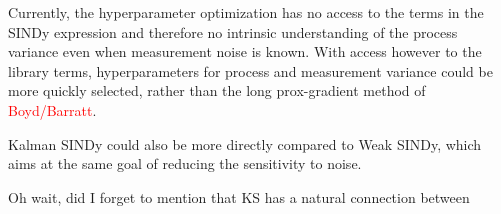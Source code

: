 \documentclass{article}
\newcommand{\red}[1]{\textcolor{red}{#1}}
\begin{document}
Currently, the hyperparameter optimization has no access to the terms in the SINDy expression and therefore no intrinsic understanding of the process variance even when measurement noise is known.  With access however to the library terms, hyperparameters for process and measurement variance could be more quickly selected, rather than the long prox-gradient method of \red{Boyd/Barratt}.

Kalman SINDy could also be more directly compared to Weak SINDy, which aims at the same goal of reducing the sensitivity to noise.

Oh wait, did I forget to mention that KS has a natural connection between


\end{document}
